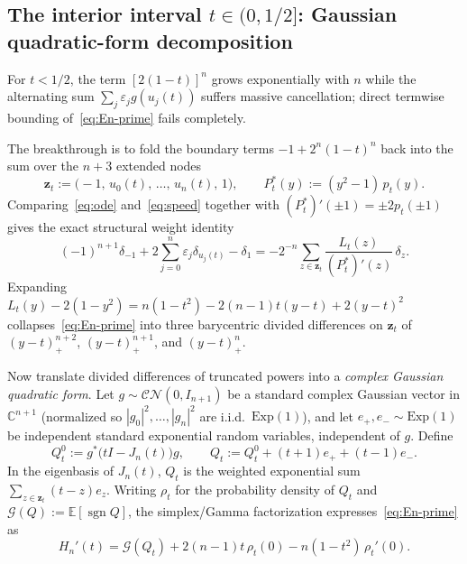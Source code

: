 \documentclass[11pt,a4paper]{article}
\newcommand{\C}{\mathbb{C}}
\newcommand{\E}{\mathbb{E}}
\newcommand{\G}{\mathcal{G}}
\newcommand{\sgn}{\operatorname{sgn}}
\theoremstyle{remark}
\numberwithin{equation}{section}
\begin{document}
\subsection{The interior interval \texorpdfstring{$t \in (0, 1/2]$}{t in (0, 1/2]}: Gaussian quadratic-form decomposition}
\label{sec:interior-decomp}

For $t < 1/2$, the term $[2(1-t)]^n$ grows exponentially with $n$ while the alternating sum $\sum_j \varepsilon_j g(u_j(t))$ suffers massive cancellation; direct termwise bounding of~\eqref{eq:En-prime} fails completely.

The breakthrough is to fold the boundary terms $-1 + 2^n(1-t)^n$ back into the sum over the $n+3$ extended nodes
\[
    \mathbf{z}_t := \bigl(-1,\, u_0(t),\, \dots,\, u_n(t),\, 1\bigr),
    \qquad
    P_t^*(y) := (y^2 - 1)\,p_t(y).
\]
Comparing~\eqref{eq:ode} and~\eqref{eq:speed} together with $(P_t^*)'(\pm 1) = \pm 2p_t(\pm 1)$ gives the exact structural weight identity
\begin{equation}
    (-1)^{n+1}\delta_{-1} + 2\sum_{j=0}^{n}\varepsilon_j \delta_{u_j(t)} - \delta_1
    = -2^{-n}\sum_{z \in \mathbf{z}_t} \frac{L_t(z)}{(P_t^*)'(z)}\,\delta_z.
    \label{eq:weight-id}
\end{equation}
Expanding $L_t(y) - 2(1 - y^2) = n(1 - t^2) - 2(n - 1)t(y - t) + 2(y - t)^2$ collapses~\eqref{eq:En-prime} into three barycentric divided differences on $\mathbf{z}_t$ of $(y-t)_+^{n+2}$, $(y-t)_+^{n+1}$, and $(y-t)_+^{n}$.

Now translate divided differences of truncated powers into a \emph{complex Gaussian quadratic form}. Let $g \sim \mathcal{CN}(0, I_{n+1})$ be a standard complex Gaussian vector in $\C^{n+1}$ (normalized so $|g_0|^2, \dots, |g_n|^2$ are i.i.d.\ $\mathrm{Exp}(1)$), and let $e_+, e_- \sim \mathrm{Exp}(1)$ be independent standard exponential random variables, independent of $g$. Define
\begin{equation}
    Q_t^0 := g^*\bigl(tI - J_n(t)\bigr)g,
    \qquad
    Q_t := Q_t^0 + (t + 1)e_+ + (t - 1)e_-.
    \label{eq:Qt-def}
\end{equation}
In the eigenbasis of $J_n(t)$, $Q_t$ is the weighted exponential sum $\sum_{z \in \mathbf{z}_t} (t - z) e_z$. Writing $\rho_t$ for the probability density of $Q_t$ and $\G(Q) := \E[\sgn Q]$, the simplex/Gamma factorization expresses~\eqref{eq:En-prime} as
\begin{equation}
    H_n'(t) = \G(Q_t) + 2(n - 1)t\,\rho_t(0) - n(1 - t^2)\,\rho_t'(0).
    \label{eq:Hprime-gauss}
\end{equation}
\end{document}

